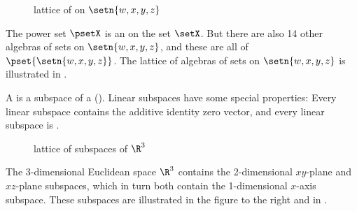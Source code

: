 %

\begin{figure}[th]
\begin{center}
{}
\caption{%
  lattice of  on $\setn{w,x,y,z}$ 
  \label{fig:algsets_wxyz}
  }
\end{center}
\end{figure}

\begin{example}
\label{ex:algsets_wxyz}
The power set $\psetX$ is an  on the set $\setX$.
But there are also 14 other algebras of sets on $\setn{w,x,y,z}$, and these are all  of $\pset{\setn{w,x,y,z}}$.
The lattice of algebras of sets on $\setn{w,x,y,z}$ is illustrated in . 
\end{example}%


A  is a subspace of a  ().
Linear subspaces have some special properties: 
Every linear subspace contains the additive identity zero vector, and every linear subspace is .

\begin{figure}[th]
\begin{center}
  
  \caption{lattice of subspaces of $\R^3$ \label{fig:latr3subspaces}}
\end{center}
\end{figure}
\begin{minipage}{\tw-63mm}
\begin{example}\label{ex:r3subspaces}
  The 3-dimensional Euclidean space $\R^3$ contains 
  the 2-dimensional $xy$-plane and $xz$-plane subspaces,
  which in turn both contain the 1-dimensional $x$-axis subspace.
  These subspaces are illustrated in the figure to the right and in .
\end{example}
\end{minipage}%
\hfill%
\begin{minipage}{60mm}%
  \begin{center}
  \footnotesize%
  \end{center}
\end{minipage}

